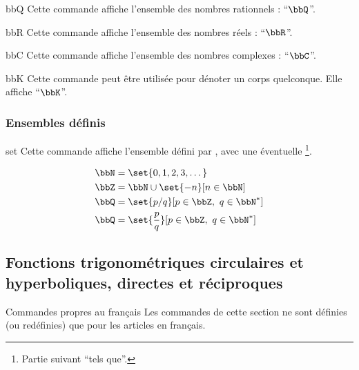 \documentclass[english,nolocaltoc]{nwejmart}
\newtheorem[style=definition]{fait}
\newtheorem[title=expérience]{experience}
\newtheorem[title-plural=anneaux]{anneau}
\newtheorem[title=idéal,title-plural=idéaux]{ideal}
\begin{document}
\begin{docCommand}{bbQ}{}
  Cette commande affiche l'ensemble des nombres rationnels : \enquote{$\bbQ$}.
\end{docCommand}

\begin{docCommand}{bbR}{}
  Cette commande affiche l'ensemble des nombres réels : \enquote{$\bbR$}.
\end{docCommand}

\begin{docCommand}{bbC}{}
  Cette commande affiche l'ensemble des nombres complexes : \enquote{$\bbC$}.
\end{docCommand}

\begin{docCommand}{bbK}{}
  Cette commande peut être utilisée pour dénoter un corps quelconque. Elle
  affiche \enquote{$\bbK$}.
\end{docCommand}

\subsubsection{Ensembles définis}

\begin{docCommand}[doc updated=2019-03-18]{set}{}
  Cette commande affiche l'ensemble défini par , avec une
  éventuelle \footnote{Partie suivant \enquote{tels
      que}.}.
\begin{bodycode}
\begin{align}
  \bbN & = \set{0,1,2,3,\dots}              \\
  \bbZ & = \bbN\cup\set{-n}[n\in\bbN]       \\
  \bbQ & = \set{p/q}[p\in\bbZ,\ q\in\bbN^*] \\
  \bbQ & = \set{\frac{p}{q}}[p\in\bbZ,\ q\in\bbN^*]
\end{align}
\end{bodycode}
\end{docCommand}

\subsection[Fonctions trigonométriques circulaires et hyperboliques]{Fonctions
  trigonométriques circulaires et hyperboliques, directes et réciproques}

\begin{dbremark}{Commandes propres au français}{}
  Les commandes de cette section ne sont définies (ou redéfinies) que pour les
  articles en français.
\end{dbremark}
\end{document}
